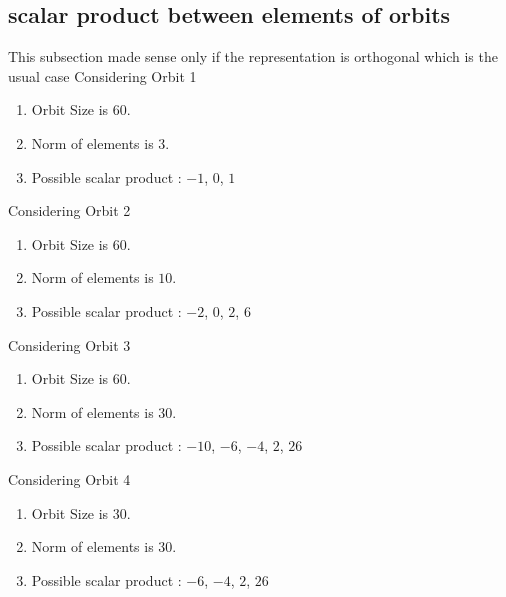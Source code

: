 \documentclass[12pt]{article}
\begin{document}
\subsection{scalar product between elements of orbits}
\noindent This subsection made sense only if the representation is orthogonal which is the usual case
Considering Orbit 1
\begin{enumerate}
\item Orbit Size is $60$.
\item Norm of elements is $3$.
\item Possible scalar product : $-1$, $0$, $1$
\end{enumerate}
Considering Orbit 2
\begin{enumerate}
\item Orbit Size is $60$.
\item Norm of elements is $10$.
\item Possible scalar product : $-2$, $0$, $2$, $6$
\end{enumerate}
Considering Orbit 3
\begin{enumerate}
\item Orbit Size is $60$.
\item Norm of elements is $30$.
\item Possible scalar product : $-10$, $-6$, $-4$, $2$, $26$
\end{enumerate}
Considering Orbit 4
\begin{enumerate}
\item Orbit Size is $30$.
\item Norm of elements is $30$.
\item Possible scalar product : $-6$, $-4$, $2$, $26$
\end{enumerate}
\end{document}
